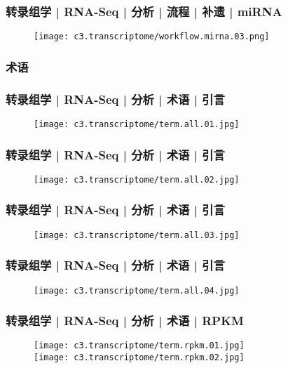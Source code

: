 \begin{frame}
  \frametitle{转录组学 | RNA-Seq | 分析 | 流程 | 补遗 | miRNA}
  \begin{figure}
    \centering
    \texttt{[image: c3.transcriptome/workflow.mirna.03.png]}
  \end{figure}
\end{frame}

\subsubsection{术语}
\begin{frame}
  \frametitle{转录组学 | RNA-Seq | 分析 | 术语 | 引言}
  \begin{figure}
    \centering
    \texttt{[image: c3.transcriptome/term.all.01.jpg]}
  \end{figure}
\end{frame}

\begin{frame}
  \frametitle{转录组学 | RNA-Seq | 分析 | 术语 | 引言}
  \begin{figure}
    \centering
    \texttt{[image: c3.transcriptome/term.all.02.jpg]}
  \end{figure}
\end{frame}

\begin{frame}
  \frametitle{转录组学 | RNA-Seq | 分析 | 术语 | 引言}
  \begin{figure}
    \centering
    \texttt{[image: c3.transcriptome/term.all.03.jpg]}
  \end{figure}
\end{frame}

\begin{frame}
  \frametitle{转录组学 | RNA-Seq | 分析 | 术语 | 引言}
  \begin{figure}
    \centering
    \texttt{[image: c3.transcriptome/term.all.04.jpg]}
  \end{figure}
\end{frame}

\begin{frame}
  \frametitle{转录组学 | RNA-Seq | 分析 | 术语 | RPKM}
  \begin{figure}
    \centering
    \texttt{[image: c3.transcriptome/term.rpkm.01.jpg]}\\
    \vspace{1em}
    \texttt{[image: c3.transcriptome/term.rpkm.02.jpg]}
  \end{figure}
\end{frame}

